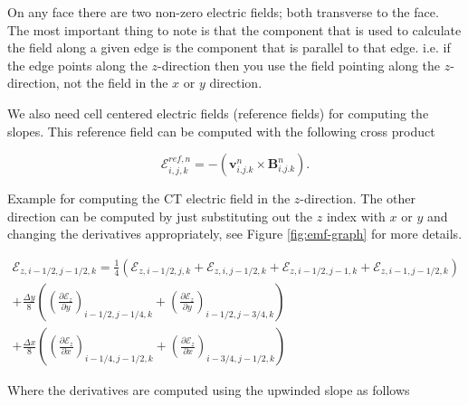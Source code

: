 On any face there are two non-zero electric fields; both transverse to the face. The most important thing to note is that the component that is used to calculate the field along a given edge is the component that is parallel to that edge. i.e. if the edge points along the $ z $-direction then you use the field pointing along the $ z $-direction, not the field in the $ x $ or $ y $ direction.

We also need cell centered electric fields (reference fields) for computing the slopes. This reference field can be computed with the following cross product

\begin{equation}
    \mathcal{E}_{i,j,k}^{ref,n} = - \left( \boldsymbol{v}^{n}_{i.j.k} \times \boldsymbol{B}^{n}_{i.j.k} \right).
\end{equation}

Example for computing the CT electric field in the $ z $-direction. The other direction can be computed by just substituting out the $ z $ index with $ x $ or $ y $ and changing the derivatives appropriately, see Figure \ref{fig:emf-graph} for more details.

\begin{equation}
    \label{eqn:emf-edge}
    \begin{aligned}
        \mathcal{E}_{z, i-1/2, j-1/2, k} = \frac{1}{4} \left(
              \mathcal{E}_{z, i-1/2, j, k}
            + \mathcal{E}_{z, i, j-1/2, k}
            + \mathcal{E}_{z, i-1/2, j-1, k}
            + \mathcal{E}_{z, i-1, j-1/2, k}\right) \\
        + \frac{\Delta y}{8} \left( \left( \frac{\partial \mathcal{E}_z }{\partial y} \right)_{i-1/2, j-1/4, k} + \left(  \frac{\partial \mathcal{E}_z }{\partial y} \right)_{i-1/2, j-3/4, k} \right) \\
        + \frac{\Delta x}{8} \left( \left( \frac{\partial \mathcal{E}_z }{\partial x} \right)_{i-1/4, j-1/2, k} + \left(  \frac{\partial \mathcal{E}_z }{\partial x} \right)_{i-3/4, j-1/2, k} \right)
    \end{aligned}
\end{equation}

Where the derivatives are computed using the upwinded slope as follows

